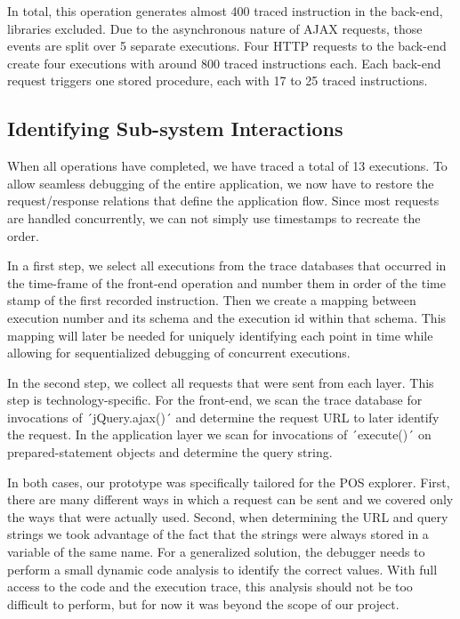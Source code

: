 In total, this operation generates almost 400 traced instruction in the back-end, libraries excluded.
Due to the asynchronous nature of AJAX requests, those events are split over 5 separate executions.
Four HTTP requests to the back-end create four executions with around 800 traced instructions each.
Each back-end request triggers one stored procedure, each with 17 to 25 traced instructions.

\subsection{Identifying Sub-system Interactions}

When all operations have completed, we have traced a total of 13 executions.
To allow seamless debugging of the entire application, we now have to restore the request/response relations that define the application flow.
Since most requests are handled concurrently, we can not simply use timestamps to recreate the order.

In a first step, we select all executions from the trace databases that occurred in the time-frame of the front-end operation and number them in order of the time stamp of the first recorded instruction.
Then we create a mapping between execution number and its schema and the execution id within that schema.
This mapping will later be needed for uniquely identifying each point in time while allowing for sequentialized debugging of concurrent executions.

In the second step, we collect all requests that were sent from each layer.
This step is technology-specific.
For the front-end, we scan the trace database for invocations of ´jQuery.ajax()´ and determine the request URL to later identify the request.
In the application layer we scan for invocations of ´execute()´ on prepared-statement objects and determine the query string.

In both cases, our prototype was specifically tailored for the POS explorer.
First, there are many different ways in which a request can be sent and we covered only the ways that were actually used.
Second, when determining the URL and query strings we took advantage of the fact that the strings were always stored in a variable of the same name.
For a generalized solution, the debugger needs to perform a small dynamic code analysis to identify the correct values.
With full access to the code and the execution trace, this analysis should not be too difficult to perform, but for now it was beyond the scope of our project.


